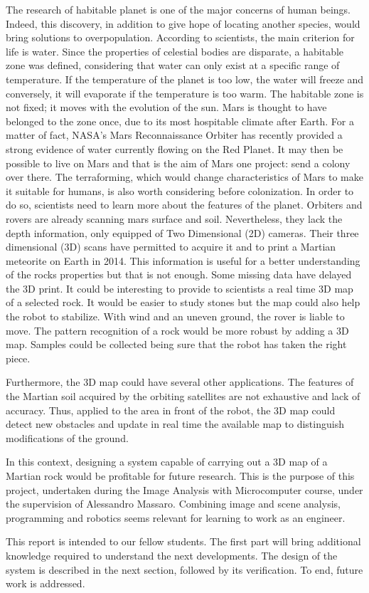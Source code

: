 The research of habitable planet is one of the major concerns of human beings. Indeed, this discovery, in addition to give hope of locating another species, would bring solutions to overpopulation. According to scientists, the main criterion for life is water. Since the properties of celestial bodies are disparate, a habitable zone was defined, considering that water can only exist at a specific range of temperature. If the temperature of the planet is too low, the water will freeze and conversely, it will evaporate if the temperature is too warm. The habitable zone is not fixed; it moves with the evolution of the sun. Mars is thought to have belonged to the zone once, due to its most hospitable climate after Earth. For a matter of fact, NASA's Mars Reconnaissance Orbiter has recently provided a strong evidence of water currently flowing on the Red Planet. It may then be possible to live on Mars and that is the aim of Mars one project: send a colony over there. The terraforming, which would change characteristics of Mars to make it suitable for humans, is also worth considering before colonization. In order to do so, scientists need to learn more about the features of the planet. Orbiters and rovers are already scanning mars surface and soil. Nevertheless, they lack the depth information, only equipped of Two Dimensional (2D) cameras. Their three dimensional (3D) scans have permitted to acquire it and to print a Martian meteorite on Earth in 2014. This information is useful for a better understanding of the rocks properties but that is not enough. Some missing data have delayed the 3D print. It could be interesting to provide to scientists a real time 3D map of a selected rock. It would be easier to study stones but the map could also help the robot to stabilize. With wind and an uneven ground, the rover is liable to move. The pattern recognition of a rock would be more robust by adding a 3D map. Samples could be collected being sure that the robot has taken the right piece. 

Furthermore, the 3D map could have several other applications. The features of the Martian soil acquired by the orbiting satellites are not exhaustive and lack of accuracy. Thus, applied to the area in front of the robot, the 3D map could detect new obstacles and update in real time the available map to distinguish modifications of the ground. 

In this context, designing a system capable of carrying out a 3D map of a Martian rock would be profitable for future research. This is the purpose of this project, undertaken during the Image Analysis with Microcomputer course, under the supervision of Alessandro Massaro. Combining image and scene analysis, programming and robotics seems relevant for learning to work as an engineer.

This report is intended to our fellow students. The first part will bring additional knowledge required to understand the next developments. The design of the system is described in the next section, followed by its verification. To end, future work is addressed.